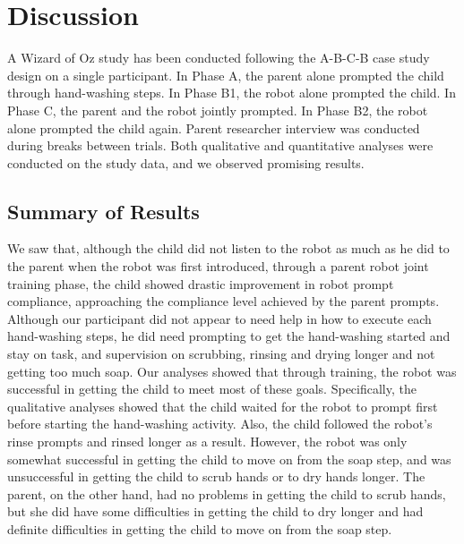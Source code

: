 \section{Discussion}
A Wizard of Oz study has been conducted following the A-B-C-B case study design on a single participant.  In Phase A, the parent alone prompted the child through hand-washing steps.  In Phase B1, the robot alone prompted the child.  In Phase C, the parent and the robot jointly prompted.  In Phase B2, the robot alone prompted the child again.  Parent researcher interview was conducted during breaks between trials.  Both qualitative and quantitative analyses were conducted on the study data, and we observed promising results.


\subsection{Summary of Results}
We saw that, although the child did not listen to the robot as much as he did to the parent when the robot was first introduced, through a parent robot joint training phase, the child showed drastic improvement in robot prompt compliance, approaching the compliance level achieved by the parent prompts.  Although our participant did not appear to need help in how to execute each hand-washing steps, he did need prompting to get the hand-washing started and stay on task, and supervision on scrubbing, rinsing and drying longer and not getting too much soap.  Our analyses showed that through training, the robot was successful in getting the child to meet most of these goals.  Specifically, the qualitative analyses showed that the child waited for the robot to prompt first before starting the hand-washing activity.  Also, the child followed the robot's rinse prompts and rinsed longer as a result.  However, the robot was only somewhat successful in getting the child to move on from the soap step, and was unsuccessful in getting the child to scrub hands or to dry hands longer.  The parent, on the other hand, had no problems in getting the child to scrub hands, but she did have some difficulties in getting the child to dry longer and had definite difficulties in getting the child to move on from the soap step.

